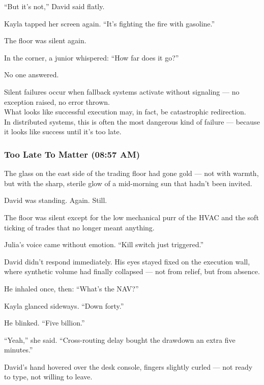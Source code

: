“But it’s not,” David said flatly.

Kayla tapped her screen again. “It’s fighting the fire with gasoline.”

The floor was silent again.

In the corner, a junior whispered: “How far does it go?”

No one answered.

\medskip

\begin{tcolorbox}[title=Silent Failure Modes, colback=gray!5, colframe=black]
Silent failures occur when fallback systems activate without signaling — no exception raised, no error thrown.\\
What looks like successful execution may, in fact, be catastrophic redirection.\\
In distributed systems, this is often the most dangerous kind of failure — because it looks like success until it’s too late.
\end{tcolorbox}

\medskip

\subsubsection{Too Late To Matter (08:57 AM)} 

The glass on the east side of the trading floor had gone gold — not with warmth, but with the sharp, 
sterile glow of a mid-morning sun that hadn’t been invited.

David was standing. Again. Still.

The floor was silent except for the low mechanical purr of the HVAC and the soft ticking of trades 
that no longer meant anything.

Julia's voice came without emotion. “Kill switch just triggered.”

David didn’t respond immediately. His eyes stayed fixed on the execution wall, where synthetic 
volume had finally collapsed — not from relief, but from absence.

He inhaled once, then: “What’s the NAV?”

Kayla glanced sideways. “Down forty.”

He blinked. “Five billion.”

“Yeah,” she said. “Cross-routing delay bought the drawdown an extra five minutes.”

David’s hand hovered over the desk console, fingers slightly curled — not ready to type, not willing to leave.

